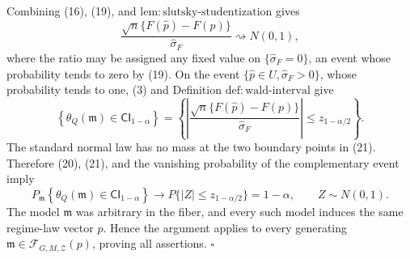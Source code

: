 Combining (16), (19), and \(\mathrm{lem:slutsky\text{-}studentization}\) gives
\[
 \frac{\sqrt n\{F(\widehat p)-F(p)\}}
      {\widehat\sigma_F}
 \rightsquigarrow N(0,1), \tag{20}
\]
where the ratio may be assigned any fixed value on \(\{\widehat\sigma_F=0\}\), an event whose probability tends to zero by (19). On the event \(\{\widehat p\in U,\widehat\sigma_F>0\}\), whose probability tends to one, (3) and Definition \(\mathrm{def:wald\text{-}interval}\) give
\[
 \left\{
 \theta_Q(\mathfrak m)\in\mathsf{CI}_{1-\alpha}
 \right\}
 =
 \left\{
 \left|
 \frac{\sqrt n\{F(\widehat p)-F(p)\}}
      {\widehat\sigma_F}
 \right|
 \leq z_{1-\alpha/2}
 \right\}. \tag{21}
\]
The standard normal law has no mass at the two boundary points in (21). Therefore (20), (21), and the vanishing probability of the complementary event imply
\[
 P_{\mathfrak m}\!\left\{
 \theta_Q(\mathfrak m)\in\mathsf{CI}_{1-\alpha}
 \right\}
 \longrightarrow
 P\{|Z|\leq z_{1-\alpha/2}\}
 =1-\alpha,
 \qquad Z\sim N(0,1). \tag{22}
\]
The model \(\mathfrak m\) was arbitrary in the fiber, and every such model induces the same regime-law vector \(p\). Hence the argument applies to every generating \(\mathfrak m\in\mathcal F_{G,M,\mathcal Z}(p)\), proving all assertions. \(\square\)